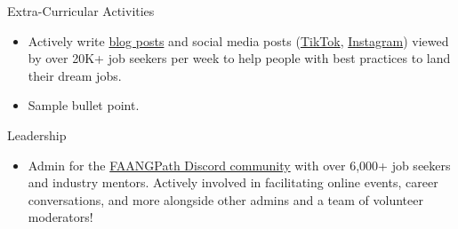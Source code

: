 \documentclass{resume} %
\begin{document}

\begin{rSection}{Extra-Curricular Activities} 
\begin{itemize}[leftmargin=*]
    \item Actively write \href{https://www.faangpath.com/blog/}{blog posts} and social media posts (\href{https://www.tiktok.com/@faangpath}{TikTok}, \href{https://www.instagram.com/faangpath/?hl=en}{Instagram}) viewed by over 20K+ job seekers per week to help people with best practices to land their dream jobs. 
    \item Sample bullet point.
\end{itemize}
\end{rSection}


\begin{rSection}{Leadership} 
\begin{itemize}[leftmargin=*]
    \item Admin for the \href{https://discord.com/invite/WWbjEaZ}{FAANGPath Discord community} with over 6,000+ job seekers and industry mentors. Actively involved in facilitating online events, career conversations, and more alongside other admins and a team of volunteer moderators! 
\end{itemize}
\end{rSection}
\end{document}
